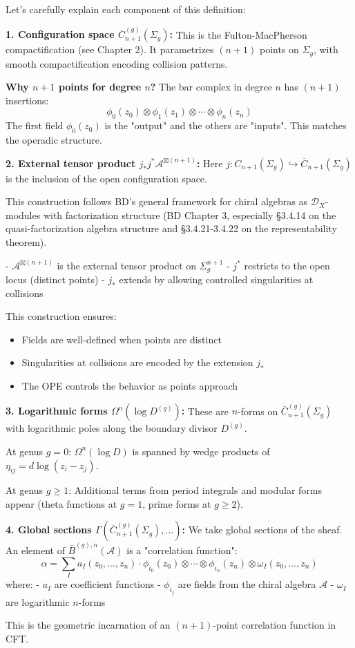 \begin{remark}\label{rem:unpacking-bar-def}
Let's carefully explain each component of this definition:

\textbf{1. Configuration space $\overline{C}_{n+1}^{(g)}(\Sigma_g)$:}
This is the Fulton-MacPherson compactification (see Chapter 2). It parametrizes $(n+1)$ points on $\Sigma_g$, with smooth compactification encoding collision patterns.

\textbf{Why $n+1$ points for degree $n$?} The bar complex in degree $n$ has $(n+1)$ insertions:
$$\phi_0(z_0) \otimes \phi_1(z_1) \otimes \cdots \otimes \phi_n(z_n)$$
The first field $\phi_0(z_0)$ is the "output" and the others are "inputs". This matches the operadic structure.

\textbf{2. External tensor product $j_*j^*\mathcal{A}^{\boxtimes(n+1)}$:}
Here $j: C_{n+1}(\Sigma_g) \hookrightarrow \overline{C}_{n+1}(\Sigma_g)$ is the inclusion of the open configuration space.

This construction follows BD's general framework for chiral algebras as 
$\mathcal{D}_X$-modules with factorization structure (BD Chapter 3, especially 
\S3.4.14 on the quasi-factorization algebra structure and \S3.4.21-3.4.22 on 
the representability theorem).

- $\mathcal{A}^{\boxtimes(n+1)}$ is the external tensor product on $\Sigma_g^{n+1}$
- $j^*$ restricts to the open locus (distinct points)
- $j_*$ extends by allowing controlled singularities at collisions

This construction ensures:
\begin{itemize}
\item Fields are well-defined when points are distinct
\item Singularities at collisions are encoded by the extension $j_*$
\item The OPE controls the behavior as points approach
\end{itemize}

\textbf{3. Logarithmic forms $\Omega^n(\log D^{(g)})$:}
These are $n$-forms on $\overline{C}_{n+1}^{(g)}(\Sigma_g)$ with logarithmic poles along the boundary divisor $D^{(g)}$.

At genus $g=0$: $\Omega^n(\log D)$ is spanned by wedge products of $\eta_{ij} = d\log(z_i - z_j)$.

At genus $g \geq 1$: Additional terms from period integrals and modular forms appear (theta functions at $g=1$, prime forms at $g \geq 2$).

\textbf{4. Global sections $\Gamma(\overline{C}_{n+1}^{(g)}(\Sigma_g), \ldots)$:}
We take global sections of the sheaf. An element of $\bar{B}^{(g),n}(\mathcal{A})$ is a "correlation function":
$$\alpha = \sum_I a_I(z_0, \ldots, z_n) \cdot \phi_{i_0}(z_0) \otimes \cdots \otimes \phi_{i_n}(z_n) \otimes \omega_I(z_0, \ldots, z_n)$$
where:
- $a_I$ are coefficient functions
- $\phi_{i_j}$ are fields from the chiral algebra $\mathcal{A}$
- $\omega_I$ are logarithmic $n$-forms

This is the geometric incarnation of an $(n+1)$-point correlation function in CFT.
\end{remark}

